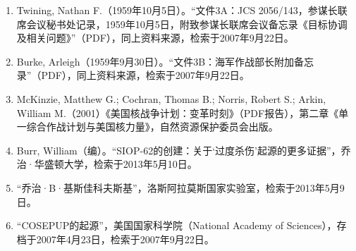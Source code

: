 \begin{enumerate}
\item Twining, Nathan F.（1959年10月5日）。“文件3A：JCS 2056/143，参谋长联席会议秘书处记录，1959年10月5日，附致参谋长联席会议备忘录《目标协调及相关问题》”（PDF），同上资料来源，检索于2007年9月22日。
\item Burke, Arleigh（1959年9月30日）。“文件3B：海军作战部长附加备忘录”（PDF），同上资料来源，检索于2007年9月22日。
\item McKinzie, Matthew G.; Cochran, Thomas B.; Norris, Robert S.; Arkin, William M.（2001）《美国核战争计划：变革时刻》（PDF报告），第二章《单一综合作战计划与美国核力量》，自然资源保护委员会出版。
\item Burr, William（编）。“SIOP-62的创建：关于‘过度杀伤’起源的更多证据”，乔治·华盛顿大学，检索于2013年5月10日。
\item “乔治·B·基斯佳科夫斯基”，洛斯阿拉莫斯国家实验室，检索于2013年5月9日。
\item “COSEPUP的起源”，美国国家科学院（National Academy of Sciences），存档于2007年4月23日，检索于2007年9月22日。

\end{enumerate}
